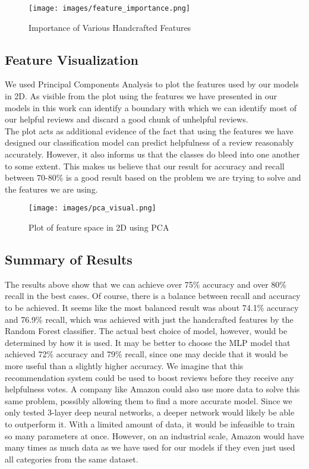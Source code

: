 \documentclass[final]{cvpr}
\begin{document}
\begin{figure}[H]
\begin{center}
\texttt{[image: images/feature\_importance.png]}
\end{center}
   \caption{Importance of Various Handcrafted Features}
\label{fig:imp_features}
\end{figure}

\subsection{Feature Visualization}

We used Principal Components Analysis to plot the features used by our models in 2D. As visible from the plot using the features we have presented in our models in this work can identify a boundary with which we can identify most of our helpful reviews and discard a good chunk of unhelpful reviews.  \\
The plot acts as additional evidence of the fact that using the features we have designed our classification model can predict helpfulness of a review reasonably accurately. However, it also informs us that the classes do bleed into one another to some extent. This makes us believe that our result for accuracy and recall between 70-80\% is a good result based on the problem we are trying to solve and the features we are using.

\begin{figure}[H]
\begin{center}
\texttt{[image: images/pca\_visual.png]}
\end{center}
   \caption{Plot of feature space in 2D using PCA}
\label{fig:pca_features}
\end{figure}

\subsection{Summary of Results}


The results above show that we can achieve over 75\% accuracy and over 80\% recall in the best cases. Of course, there is a balance between recall and accuracy to be achieved. It seems like the most balanced result was about 74.1\% accuracy and 76.9\% recall, which was achieved with just the handcrafted features by the Random Forest classifier. The actual best choice of model, however, would be determined by how it is used. It may be better to choose the MLP model that achieved 72\% accuracy and 79\% recall, since one may decide that it would be more useful than a slightly higher accuracy. We imagine that this recommendation system could be used to boost reviews before they receive any helpfulness votes. A company like Amazon could also use more data to solve this same problem, possibly allowing them to find a more accurate model. Since we only tested 3-layer deep neural networks, a deeper network would likely be able to outperform it. With a limited amount of data, it would be infeasible to train so many parameters at once. However, on an industrial scale, Amazon would have many times as much data as we have used for our models if they even just used all categories from the same dataset.
\end{document}
